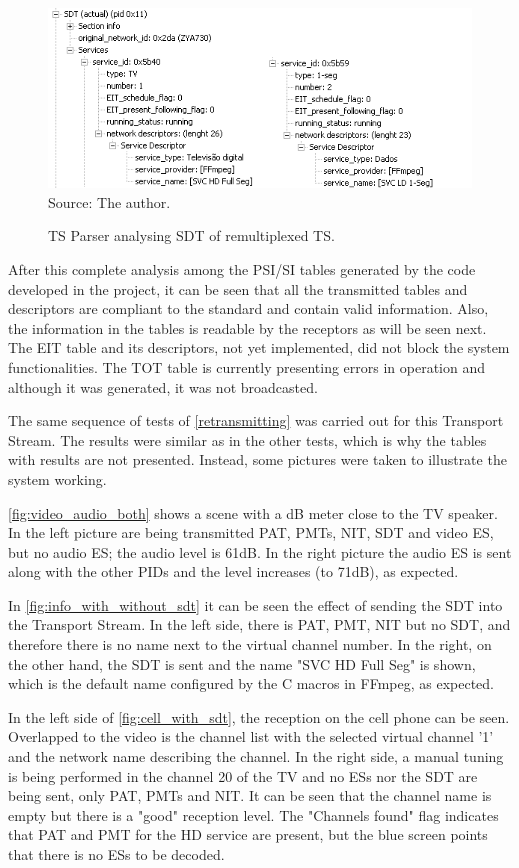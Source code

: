 \documentclass[
	12pt,				%
	openright,			%
	twoside,			%
	a4paper,			%
	brazil,
	french,				%
	english
	]{abntex2}
\begin{document}
\begin{figure}[!h]
\centering
\caption{TS Parser analysing SDT of remultiplexed TS.}
\includegraphics[width=0.9\linewidth]{figuras/ts_parser_tve_remux_sdt.png}
\\Source: The author.
\label{fig:ts_parser_tve_remux_sdt}
\end{figure}

After this complete analysis among the PSI/SI tables generated by the code developed in the project, it can be seen that all the transmitted tables and descriptors are compliant to the standard and contain valid information. Also, the information in the tables is readable by the receptors as will be seen next. The EIT table and its descriptors, not yet implemented, did not block the system functionalities. The TOT table is currently presenting errors in operation and although it was generated, it was not broadcasted.

The same sequence of tests of \autoref{retransmitting} was carried out for this Transport Stream. The results were similar as in the other tests, which is why the tables with results are not presented. Instead, some pictures were taken to illustrate the system working.

\autoref{fig:video_audio_both} shows a scene with a dB meter close to the TV speaker. In the left picture are being transmitted PAT, PMTs, NIT, SDT and video ES, but no audio ES; the audio level is 61dB. In the right picture the audio ES is sent along with the other PIDs and the level increases (to 71dB), as expected.

In \autoref{fig:info_with_without_sdt} it can be seen the effect of sending the SDT into the Transport Stream. In the left side, there is PAT, PMT, NIT but no SDT, and therefore there is no name next to the virtual channel number. In the right, on the other hand, the SDT is sent and the name "SVC HD Full Seg" is shown, which is the default name configured by the C macros in FFmpeg, as expected.

In the left side of \autoref{fig:cell_with_sdt}, the reception on the cell phone can be seen. Overlapped to the video is the channel list with the selected virtual channel '1' and the network name describing the channel. In the right side, a manual tuning is being performed in the channel 20 of the TV and no ESs nor the SDT are being sent, only PAT, PMTs and NIT. It can be seen that the channel name is empty but there is a "good" reception level. The "Channels found" flag indicates that PAT and PMT for the HD service are present, but the blue screen points that there is no ESs to be decoded.
\end{document}
